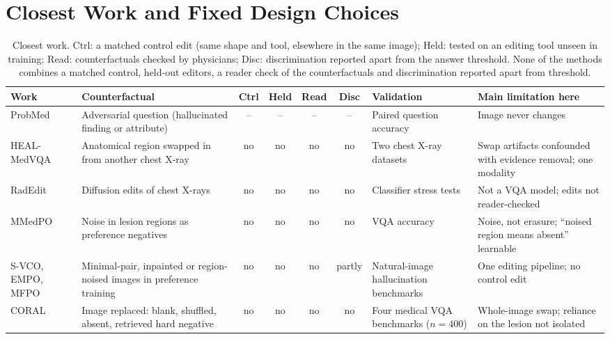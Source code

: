 \documentclass[10pt]{article}
\begin{document}
\section{Closest Work and Fixed Design Choices}
\begin{table}[!htbp]
\caption{Closest work. Ctrl: a matched control edit (same shape and tool, elsewhere in the same image); Held: tested on an editing tool unseen in training; Read: counterfactuals checked by physicians; Disc: discrimination reported apart from the answer threshold. None of the methods combines a matched control, held-out editors, a reader check of the counterfactuals and discrimination reported apart from threshold.}
\label{tab:related}
\begin{center}
\scriptsize
\setlength{\tabcolsep}{3pt}
\begin{adjustbox}{max width=\linewidth}
\begin{tabular}{L{2.2cm}L{2.9cm}cccc L{2.0cm}L{2.6cm}}
\toprule
\textbf{Work} & \textbf{Counterfactual} & \textbf{Ctrl} & \textbf{Held} & \textbf{Read} & \textbf{Disc} & \textbf{Validation} & \textbf{Main limitation here} \\
\midrule
ProbMed \citep{yan2024probmed} & Adversarial question (hallucinated finding or attribute) & -- & -- & -- & -- & Paired question accuracy & Image never changes \\
HEAL-MedVQA \citep{healmedvqa2024} & Anatomical region swapped in from another chest X-ray & no & no & no & no & Two chest X-ray datasets & Swap artifacts confounded with evidence removal; one modality \\
RadEdit \citep{perez2024radedit} & Diffusion edits of chest X-rays & no & no & no & no & Classifier stress tests & Not a VQA model; edits not reader-checked \\
MMedPO \citep{zhu2024mmedpo} & Noise in lesion regions as preference negatives & no & no & no & no & VQA accuracy & Noise, not erasure; ``noised region means absent'' learnable \\
S-VCO, EMPO, MFPO \citep{svco2024,wu2025empo,jiang2025mfpo} & Minimal-pair, inpainted or region-noised images in preference training & no & no & no & partly & Natural-image hallucination benchmarks & One editing pipeline; no control edit \\
CORAL \citep{zafar2026coral} & Image replaced: blank, shuffled, absent, retrieved hard negative & no & no & no & no & Four medical VQA benchmarks ($n = 400$) & Whole-image swap; reliance on the lesion not isolated \\

\end{tabular}
\end{adjustbox}
\end{center}
\end{table}
\end{document}
